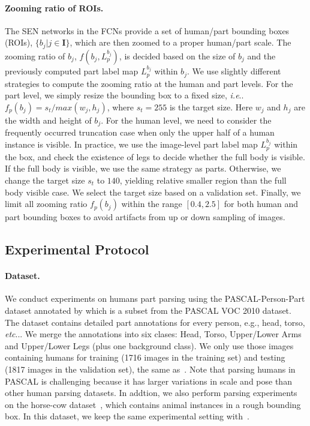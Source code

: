 \documentclass[runningheads]{llncs}
\makeatletter
\newcommand{\ve}[1]{{\mathbf #1}}
\DeclareRobustCommand\onedot{\futurelet\@let@token\@onedot}
\def\@onedot{\ifx\@let@token.\else.\null\fi\xspace}
\def\ie{\emph{i.e}\onedot} \def\Ie{\emph{I.e}\onedot}
\def\etc{\emph{etc}\onedot} \def\vs{\emph{vs}\onedot}
\makeatother
\begin{document}
\paragraph{Zooming ratio of ROIs.}
The SEN networks in the FCNs provide a set of human/part bounding boxes (ROIs), $\{b_j | j\in \ve{I}\}$, which are then zoomed to a proper human/part scale. The zooming ratio of $b_j$, $f(b_j, L^{b_j}_p)$, is decided based on the size of $b_j$ and the previously computed part label map $L^{b_j}_p$ within $b_j$. We use slightly different strategies to compute the zooming ratio at the human and part levels. 
For the part level, we simply resize the bounding box to a fixed size, \ie $f_p(b_j) = s_t / max(w_j, h_j)$, where $s_t = 255$ is the target size. Here $w_j$ and $h_j$ are the width and height of $b_j$. 
For the human level, we need to consider the frequently occurred truncation case when only the upper half of a human instance is visible. 
In practice, we use the image-level part label map $L^{b_j}_p$ within the box, and check the existence of legs to decide whether the full body is visible. If the full body is visible, we use the same strategy as parts. Otherwise, we change the target size $s_t$ to $140$, yielding relative smaller region than the full body visible case. We select the target size based on a validation set. 
Finally, we limit all zooming ratio $f_p(b_j)$ within the range $[0.4, 2.5]$ for both human and part bounding boxes to avoid artifacts from up or down sampling of images.














\vspace{-0.7\baselineskip}
\subsection{Experimental Protocol}
\paragraph{Dataset.} We conduct experiments on humans part parsing using the PASCAL-Person-Part dataset annotated by \cite{chen2014detect} which is a subset from the PASCAL VOC 2010 dataset.  The dataset contains detailed part annotations for every person, e.g., head, torso, \etc. We merge the annotations into six clases: Head, Torso, Upper/Lower Arms and Upper/Lower Legs (plus one background class). 
We only use those images containing humans for training (1716 images in the training set) and testing (1817 images in the validation set), the same as~\cite{chen2015attention}. Note that parsing humans in PASCAL is challenging because it has larger variations in scale and pose than other human parsing datasets. 
In addtion, we also perform parsing experiments on the horse-cow dataset~\cite{wang2014semantic}, which contains animal instances in a rough bounding box. In this dataset, we keep the same experimental setting with~\cite{wang2015joint}.
\end{document}
